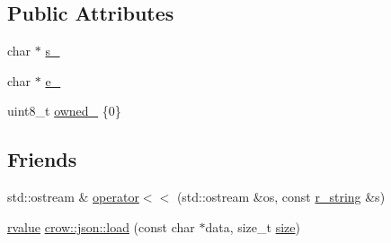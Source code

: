 \subsection*{Public Attributes}
\begin{DoxyCompactItemize}
\item 
char $\ast$ \hyperlink{structcrow_1_1json_1_1detail_1_1r__string_a9a0a048fb2cb904e8336926817947448}{s\-\_\-}
\item 
char $\ast$ \hyperlink{structcrow_1_1json_1_1detail_1_1r__string_adeb368c4c0dfeb349bb32129e8dee23b}{e\-\_\-}
\item 
uint8\-\_\-t \hyperlink{structcrow_1_1json_1_1detail_1_1r__string_aebfcc625db6a89f8c358292165a2fdd2}{owned\-\_\-} \{0\}
\end{DoxyCompactItemize}
\subsection*{Friends}
\begin{DoxyCompactItemize}
\item 
std\-::ostream \& \hyperlink{structcrow_1_1json_1_1detail_1_1r__string_a4d4e7c489d50d83afcf5a8ce9264e4bb}{operator$<$$<$} (std\-::ostream \&os, const \hyperlink{structcrow_1_1json_1_1detail_1_1r__string}{r\-\_\-string} \&s)
\item 
\hyperlink{classcrow_1_1json_1_1rvalue}{rvalue} \hyperlink{structcrow_1_1json_1_1detail_1_1r__string_aafce907806967e65bf422f4907f26813}{crow\-::json\-::load} (const char $\ast$data, size\-\_\-t \hyperlink{structcrow_1_1json_1_1detail_1_1r__string_a18e9862751bc53b22edc498d46f6a2cf}{size})
\end{DoxyCompactItemize}


